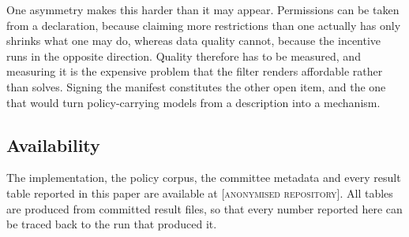 \documentclass[sigconf,anonymous,review]{acmart}
\newcommand{\repourl}{\textsc{[anonymised repository]}}
\begin{document}
One asymmetry makes this harder than it may appear. Permissions can be taken from
a declaration, because claiming more restrictions than one actually has only
shrinks what one may do, whereas data quality cannot, because the incentive runs
in the opposite direction. Quality therefore has to be measured, and measuring it
is the expensive problem that the filter renders affordable rather than solves.
Signing the manifest constitutes the other open item, and the one that would turn
policy-carrying models from a description into a mechanism.

\subsection*{Availability}

The implementation, the policy corpus, the committee metadata and every result
table reported in this paper are available at \repourl. All tables are produced
from committed result files, so that every number reported here can be traced
back to the run that produced it.



\end{document}
